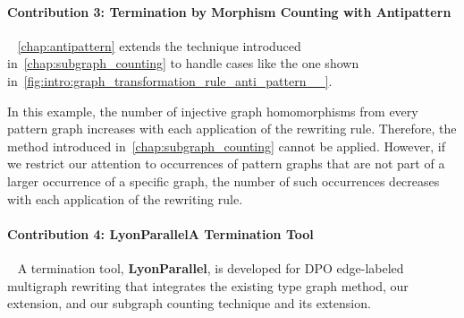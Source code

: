 \paragraph{Contribution 3: Termination by Morphism Counting with Antipattern}
\ \newline
\autoref{chap:antipattern} extends the technique introduced in~\autoref{chap:subgraph_counting} to handle cases like the one shown in~\autoref{fig:intro:graph_transformation_rule_anti_pattern__}.
 \begin{figure}[!ht]
    \centering
{}
  \caption{}
  \label{fig:intro:graph_transformation_rule_anti_pattern__}
 \end{figure} 
In this example, the number of injective graph homomorphisms from every pattern graph increases with each application of the rewriting rule. Therefore, the method introduced in~\autoref{chap:subgraph_counting} cannot be applied. However, if we restrict our attention to occurrences of pattern graphs that are not part of a larger occurrence of a specific graph, the number of such occurrences decreases with each application of the rewriting rule. 

\paragraph{Contribution 4: LyonParallel\textemdash A Termination Tool}
\ \newline
A termination tool, \textbf{LyonParallel}, is developed for DPO edge-labeled multigraph rewriting that integrates the existing type graph method, our extension, and our subgraph counting technique and its extension.